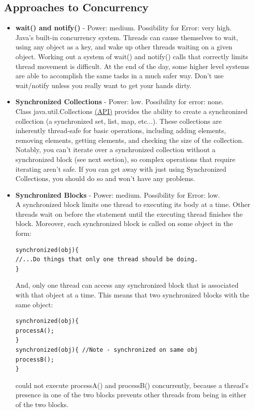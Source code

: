 \documentclass[11pt]{article}
\begin{document}
\subsection{Approaches to Concurrency}
\begin{itemize}
\item \textbf{wait() and notify()} - Power: medium. Possibility for Error: very high.\\
Java's built-in concurrency system. Threads can cause themselves to wait, using any object as a key, and wake up other threads waiting on a given object. Working out a system of wait() and notify() calls that correctly limits thread movement is difficult. At the end of the day, some higher level systems are able to accomplish the same tasks in a much safer way. Don't use wait/notify unless you really want to get your hands dirty.
\item \textbf{Synchronized Collections} - Power: low. Possibility for error: none. \\
Class java.util.Collections \href{http://docs.oracle.com/javase/7/docs/api/java/util/Collections.html\#synchronizedCollection(java.util.Collection)}{({\color{blue}\underline{API}})} provides the ability to create a synchronized collection (a synchronized set, list, map, etc...). These collections are inherently thread-safe for basic operations, including adding elements, removing elements, getting elements, and checking the size of the collection. Notably, you can't iterate over a synchronized collection without a synchronized block (see next section), so complex operations that require iterating aren't safe. If you can get away with just using Synchronized Collections, you should do so and won't have any problems.
\item \textbf{Synchronized Blocks} - Power: medium. Possibility for Error: low.\\
A synchronized block limits one thread to executing its body at a time. Other threads wait on before the statement until the executing thread finishes the block. Moreover, each synchronized block is called on some object in the form:
\begin{lstlisting}[frame=single]
synchronized(obj){
//...Do things that only one thread should be doing.
}
\end{lstlisting}
And, only one thread can access any synchronized block that is associated with that object at a time. This means that two synchronized blocks with the same object:\\
\begin{lstlisting}[frame=single]
synchronized(obj){
processA();
}
synchronized(obj){ //Note - synchronized on same obj
processB();
}
\end{lstlisting}
could not execute processA() and processB()  concurrently, because a thread's presence in one of the two blocks prevents other threads from being in either of the two blocks.\\


\end{itemize}
\end{document}
